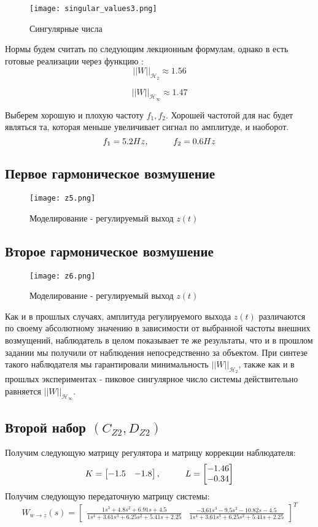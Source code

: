 \begin{figure}[ht]
  \centering
  \texttt{[image: singular\_values3.png]}
  \caption{Сингулярные числа}
\end{figure}
Нормы будем считать по следующим лекционным формулам, однако в  
есть готовые реализации через функцию :
$$
    ||W||_{\mathcal{H}_2}  \approx 1.56
$$

$$
    ||W||_{\mathcal{H}_\infty}  \approx 1.47
$$

Выберем хорошую и плохую частоту $f_1, f_2$. 
Хорошей частотой для нас будет являться та, которая меньше увеличивает сигнал по амплитуде, и наоборот.
$$
    f_1 = 5.2 Hz, \hspace*{1cm} f_2 = 0.6 Hz
$$

\subsection{Первое гармоническое возмушение}
\begin{figure}[ht]
    \centering
    \texttt{[image: z5.png]}
    \caption{Моделирование -  регулируемый выход $z(t)$}
  \end{figure}

\newpage
\subsection{Второе гармоническое возмушение}
\begin{figure}[ht]
    \centering
    \texttt{[image: z6.png]}
    \caption{Моделирование -  регулируемый выход $z(t)$}
  \end{figure}

Как и в прошлых случаях, амплитуда регулируемого выхода $z(t)$ различаются по своему абсолютному значению в зависимости от выбранной частоты
внешних возмущений, наблюдатель в целом показывает те же результаты, что и в прошлом задании мы получили от наблюдения непосредственно за объектом. 
При синтезе такого наблюдателя мы гарантировали минимальность $||W||_{\mathcal{H}_2}$, 
также как и в прошлых экспериментах - пиковое сингулярное число системы действительно равняется $||W||_{\mathcal{H}_\infty}$.

\newpage
\subsection{Второй набор $(C_{Z2},D_{Z2})$}
Получим следующую матрицу регулятора и матрицу коррекции наблюдателя: 
$$
    K = \begin{bmatrix}
        -1.5 & -1.8 \\
    \end{bmatrix}, \hspace*{1cm} 
    L = \begin{bmatrix} -1.46 \\ -0.34 \\ \end{bmatrix}
$$
Получим следующую передаточную матрицу системы:
$$
    W_{w\rightarrow z}(s) = \begin{bmatrix}\frac{1s^{3} + 4.8s^{2} + 6.91s + 4.5}{1s^{4} + 3.61s^{3} + 6.25s^{2} + 5.41s + 2.25} & \frac{-3.61s^{3} - 9.5s^{2} - 10.82s - 4.5}{1s^{4} + 3.61s^{3} + 6.25s^{2} + 5.41s + 2.25} \end{bmatrix}^T
$$


